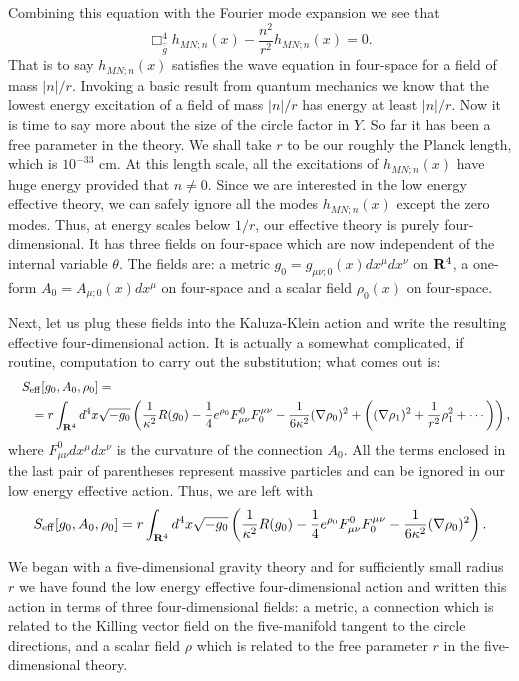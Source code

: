 Combining this equation with the Fourier mode expansion we see that
$$\Box^4_{\widehat{\overline{g}}}h_{MN;n}(x)-\frac{n^2}{r^2}h_{MN;n}(x)=0.$$
That is to say $h_{MN;n}(x)$ satisfies the wave equation
in four-space for a field of
mass $|n|/r$.  Invoking a basic result from quantum mechanics we
know that the lowest energy excitation of a field of mass $|n|/r$ has
energy at least $|n|/r$.
Now it is time to say more about the size of the circle factor in $Y$.
So far it has been a free parameter in the theory. We shall take $r$
to be our roughly the Planck length, which is $10^{-33}$ cm. At this
length scale, all the excitations of $h_{MN;n}(x)$ have huge energy
provided that $n\not= 0$. Since we are interested in the low energy
effective theory, we can safely ignore all the modes $h_{MN;n}(x)$
except the zero modes.
Thus, at  energy scales below $1/r$, our effective theory is purely
four-dimensional.  It has three fields on four-space which are now   
independent of the internal variable $\theta$. The fields are: a
metric $g_0=g_{\mu\nu;0}(x)dx^\mu dx^\nu$ on ${\bf R}^4$, a one-form
$A_{0}=A_{\mu;0}(x) dx^\mu$ on four-space and a scalar field $\rho_0(x)$ on
four-space.    

Next, let us plug these fields into the Kaluza-Klein action  and write
the resulting  effective four-dimensional action. 
 It is actually a somewhat complicated, if routine, computation to
carry out the substitution; what comes out is:
\begin{eqnarray*}
\lefteqn{S_{\rm eff}[g_{0},A_{0},\rho_0] = } &  & \\
\quad & & =r\int_{{\bf
R}^4}d^4x\sqrt{-g_{0}}\left(
\frac{1}{\kappa^2}R(g_{0})-\frac{1}{4}e^{\rho_0}
F_{\mu\nu}^0F^{\mu\nu}_{0}
-\frac{1}{6\kappa^2}(\nabla\rho_0)^2
+\left((\nabla\rho_1)^2+ \frac{1}{r^2}\rho_1^2+\cdots
\right)\right), 
\end{eqnarray*}
where $F^0_{\mu\nu}dx^\mu dx^\nu$ is the curvature of the connection
$A_{0}$.  
All the terms enclosed in the last pair of parentheses represent massive
particles and can be ignored in our low energy effective action.
Thus, we are left with
$$S_{\rm eff}[g_{0},A_{0},\rho_0]=r\int_{{\bf
R}^4}d^4x\sqrt{-g_{0}}\left(
\frac{1}{\kappa^2}R(g_{0})-\frac{1}{4}e^{\rho_0}
F_{\mu\nu}^0F^{\mu\nu}_{0}
-\frac{1}{6\kappa^2}(\nabla\rho_0)^2\right).$$
 


We began with a five-dimensional gravity theory and for sufficiently
small radius $r$ we have found the low energy effective four-dimensional
action and written this action in terms of three four-dimensional
fields: a metric, a connection which is related to the Killing vector 
field on the five-manifold tangent to the circle directions, and a
scalar field $\rho$ which is related 
to the free parameter $r$ in the five-dimensional theory.




